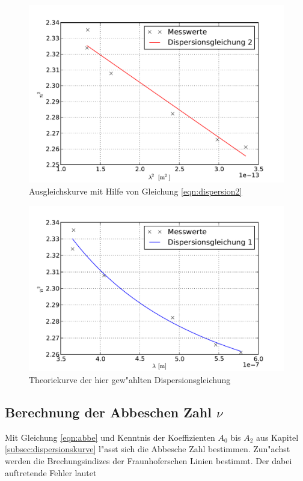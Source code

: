 		\begin{figure}[h]
			\centering
			\includegraphics[width = 13cm]{img/dispersion2.pdf}
			\caption{Ausgleichskurve mit Hilfe von Gleichung \eqref{eqn:dispersion2} \label{fig:dispersion2}}
		\end{figure}

		\begin{figure}[h]
			\centering
			\includegraphics[width = 13cm]{img/dispersionNichtLinear.pdf}
			\caption{Theoriekurve der hier gew"ahlten Dispersionsgleichung \label{fig:dispersionNichtLinear}}
		\end{figure}

	\clearpage

	\subsection{Berechnung der Abbeschen Zahl $\nu$}
	\label{subsec:abbe}
		Mit Gleichung \eqref{eqn:abbe} und Kenntnis der Koeffizienten $A_0$ bis $A_2$ aus Kapitel \ref{subsec:dispersionskurve} l"asst sich die Abbesche Zahl bestimmen.
		Zun"achst werden die Brechungsindizes der Fraunhoferschen Linien bestimmt. Der dabei auftretende Fehler lautet

